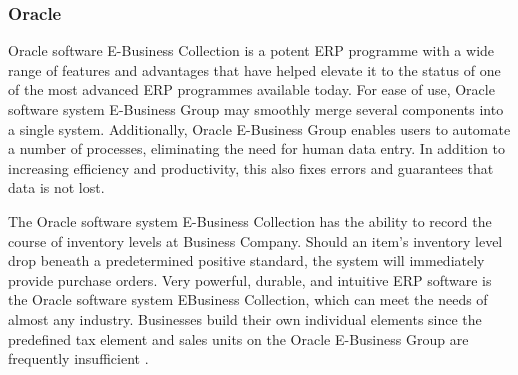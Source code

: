 \subsubsection{Oracle}
\par{Oracle software E-Business Collection \citep{barr2014oracle} is a potent ERP programme with a wide range of features and advantages that have helped elevate it to the status of one of the most advanced ERP programmes available today. For ease of use, Oracle software system E-Business Group may smoothly merge several components into a single system. Additionally, Oracle E-Business Group enables users to automate a number of processes, eliminating the need for human data entry. In addition to increasing efficiency and productivity, this also fixes errors and guarantees that data is not lost. 

The Oracle software system E-Business Collection has the ability to record the course of inventory levels at Business Company. Should an item's inventory level drop beneath a predetermined positive standard, the system will immediately provide purchase orders. Very powerful, durable, and intuitive ERP software is the Oracle software system EBusiness Collection, which can meet the needs of almost any industry. Businesses build their own individual elements since the predefined tax element and sales units on the Oracle E-Business Group are frequently insufficient \citep{barr2014oracle}.}

